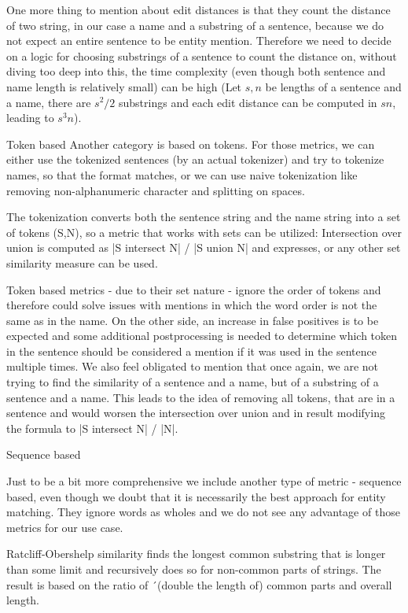 One more thing to mention about edit distances is that they count the distance of two string, in our case a name and a substring of a sentence, because we do not expect an entire sentence to be entity mention. Therefore we need to decide on a logic for choosing substrings of a sentence to count the distance on, without diving too deep into this, the time complexity (even though both sentence and name length is relatively small) can be high (Let $s, n$ be lengths of a sentence and a name, there are $s^2/2$ substrings and each edit distance can be computed in $sn$, leading to $s^3n$). 

Token based
Another category is based on tokens. For those metrics, we can either use the tokenized sentences (by an actual tokenizer) and try to tokenize names, so that the format matches, or we can use naive tokenization like removing non-alphanumeric character and splitting on spaces.

The tokenization converts both the sentence string and the name string into a set of tokens (S,N), so a metric that works with sets can be utilized: Intersection over union is computed as |S intersect N| / |S union N| and expresses, or any other set similarity measure can be used. 

Token based metrics - due to their set nature - ignore the order of tokens and therefore could solve issues with mentions in which the word order is not the same as in the name. On the other side, an increase in false positives is to be expected and some additional postprocessing is needed to determine which token in the sentence should be considered a mention if it was used in the sentence multiple times. We also feel obligated to mention that once again, we are not trying to find the similarity of a sentence and a name, but of a substring of a sentence and a name. This leads to the idea of removing all tokens, that are in a sentence and would worsen the intersection over union and in result modifying the formula to   |S intersect N| / |N|.


Sequence based

Just to be a bit more comprehensive we include another type of metric - sequence based, even though we doubt that it is necessarily the best approach for entity matching. They ignore words as wholes and we do not see any advantage of those metrics for our use case. 

Ratcliff-Obershelp similarity finds the longest common substring that is longer than some limit and recursively does so for non-common parts of strings. The result is based on the ratio of ´(double the length of) common parts and overall length. 

